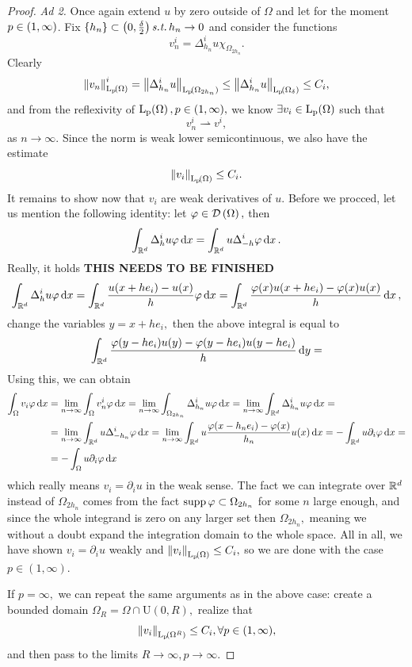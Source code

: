 \documentclass{article}
\begin{document}
\begin{proof}
	\textit{Ad 2.}
	Once again extend $u$ by zero outside of $\Omega$ and let for the moment $p \in \qty(1,\infty)$. Fix $\qty{h_n} \subset \qty(0, \frac{\delta}{2}) \, \text{\textit{s.t.}} \, h_n \to 0$ and consider the functions
	\[
		v_n^i = \Delta_{h_n}^i u \chi_{\Omega_{2 h_n}}.
	\]
	Clearly
	\[
		\norm{v_n}^i_{\LpSet{\Omega}} = \norm{\Delta^i_{{h_n}} u}_{\LpSet{\Omega_{2 h_n}}} \leq \norm{\Delta^i_{{h_n}} u}_{\LpSet{\Omega_{\delta}}} \leq C_i,
	\]
	and from the reflexivity of $\LpSet{\Omega}, p \in \qty(1, \infty),$ we know $\exists v_i \in \LpSet{\Omega}$ such that
	\[
		v_n^i \rightharpoonup v^i,
	\]
	as $n \to \infty.$ Since the norm is weak lower semicontinuous, we also have the estimate
	\[
		\norm{v_i}_{\LpSet{\Omega}} \leq C_i.
	\]
	It remains to show now that $v_i$ are weak derivatives of $u$. Before we procced, let us mention the following identity: let $\varphi \in \mathcal{D}\!\,\left(\Omega \right),$ then
	\[
		\int_{{\mathbb R}^{d}}\Delta_h^i u \varphi\dd{x} = \int_{{\mathbb R}^{d}}u \Delta_{-h}^i \varphi\dd{x}.
	\]
	Really, it holds \textbf{THIS NEEDS TO BE FINISHED}
	\[
		\int_{{\mathbb R}^{d}}\Delta_h^i u \varphi\dd{x} = \int_{{\mathbb R}^{d}}\frac{u\qty(x+he_i) - u\qty(x)}{h}\varphi\dd{x} = \int_{{\mathbb R}^{d}}\frac{\varphi(x) u\qty(x+he_i) - \varphi(x) u(x)}{h}\dd{x},
	\]
	change the variables $y = x+ he_i,$ then the above integral is equal to
	\[
		\int_{{\mathbb R}^{d}}\frac{\varphi\qty(y - he_i)u(y) - \varphi(y - he_i) u\qty(y-he_i)}{h}\dd{y} =
	\]
	Using this, we can obtain 
	\begin{align*}
		\int_{\Omega}v_i \varphi\dd{x} &= \lim_{n \to \infty}\int_{\Omega}v_n^i \varphi \dd{x} = \lim_{n \to \infty}\int_{\Omega_{2h_n}}\Delta_{h_n}^i u \varphi\dd{x} = \lim_{n \to \infty} \int_{{\mathbb R}^{d}}\Delta_{h_n}^i u \varphi\dd{x} = \\
					       &= \lim_{n\to \infty}\int_{{\mathbb R}^{d}}u \Delta_{-h_n}^i \varphi \dd{x} = \lim_{n \to \infty}\int_{{\mathbb R}^{d}}u \frac{\varphi(x- h_n e_i) - \varphi(x)}{h_n}u(x)\dd{x} =  -\int_{{\mathbb R}^{d}}u \partial_{i}\varphi\dd{x} = \\
					       &=- \int_{\Omega}u \partial_{i} \varphi \dd{x}
	\end{align*}
which really means $v_i = \partial_{i} u$ in the weak sense. The fact we can integrate over ${\mathbb R}^{d}$ instead of $\Omega_{2h_n}$ comes from the fact $\operatorname{supp} \varphi \subset \Omega_{2h_n}$ for some $n$ large enough, and since the whole integrand is zero on any larger set then $\Omega_{2h_n},$ meaning we without a doubt expand the integration domain to the whole space. All in all, we have shown $v_i = \partial_{i} u$ weakly and $\norm{v_i}_{\LpSet{\Omega}} \leq C_i,$ so we are done with the case $p \in (1, \infty).$

If $p = \infty,$ we can repeat the same arguments as in the above case: create a bounded domain $\Omega_R = \Omega \cap \text{U}(0,R),$ realize that
\[
	\norm{v_i}_{\LpSet{\Omega^R}} \leq C_i, \forall p \in (1, \infty),
\]
and then pass to the limits $R \to \infty, p \to \infty.$

\end{proof}
\end{document}

